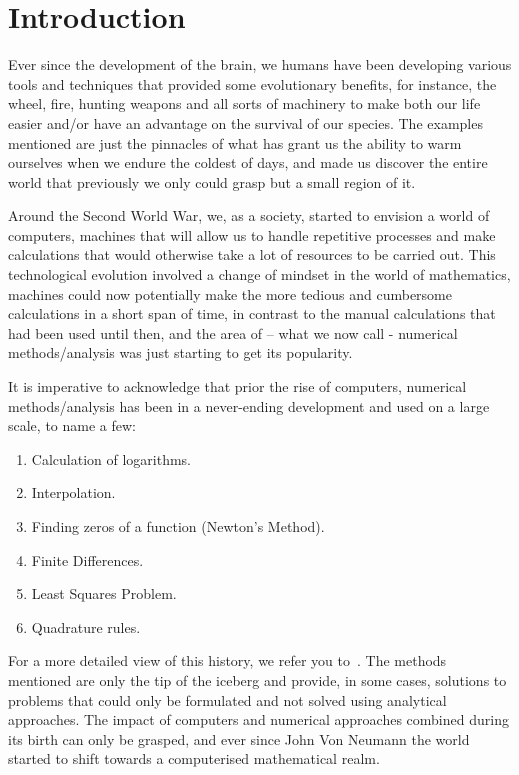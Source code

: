 \chapter{Introduction}

Ever since the development of the brain, we humans have been developing various tools and techniques that provided some evolutionary benefits, for instance, the wheel, fire, hunting weapons and all sorts of machinery to make both our life easier and/or have an advantage on the survival of our species. The examples mentioned are just the pinnacles of what has grant us the ability to warm ourselves when we endure the coldest of days, and made us discover the entire world that previously we only could grasp but a small region of it.

Around the Second World War, we, as a society, started to envision a world of computers, machines that will allow us to handle repetitive processes and make calculations that would otherwise take a lot of resources to be carried out. This technological evolution involved a change of mindset in the world of mathematics, machines could now potentially make the more tedious and cumbersome calculations in a short span of time, in contrast to the manual calculations that had been used until then, and the area of – what we now call - numerical methods/analysis was just starting to get its popularity.

It is imperative to acknowledge that prior the rise of computers, numerical methods/analysis has been in a never-ending development and used on a large scale, to name a few:
\begin{enumerate}
    \item Calculation of logarithms.
    \item Interpolation.
    \item Finding zeros of a function (Newton's Method).
    \item Finite Differences.
    \item Least Squares Problem.
    \item Quadrature rules.
\end{enumerate}

For a more detailed view of this history, we refer you to~\cite{goldstine2012history}. The methods mentioned are only the tip of the iceberg and provide, in some cases, solutions to problems that could only be formulated and not solved using analytical approaches. 
The impact of computers and numerical approaches combined during its birth can only be grasped, and ever since John Von Neumann the world started to shift towards a computerised mathematical realm. 


